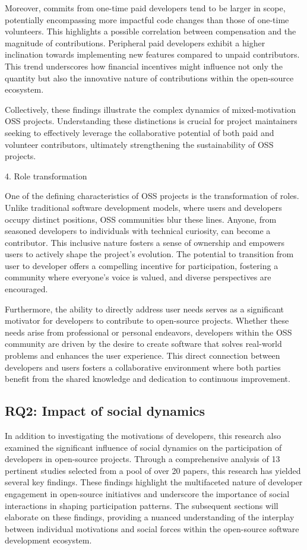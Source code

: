 Moreover, commits from one-time paid developers tend to be larger in scope, potentially encompassing more impactful code changes than those of one-time volunteers. This highlights a possible correlation between compensation and the magnitude of contributions. Peripheral paid developers exhibit a higher inclination towards implementing new features compared to unpaid contributors. This trend underscores how financial incentives might influence not only the quantity but also the innovative nature of contributions within the open-source ecosystem.

Collectively, these findings illustrate the complex dynamics of mixed-motivation OSS projects. Understanding these distinctions is crucial for project maintainers seeking to effectively leverage the collaborative potential of both paid and volunteer contributors, ultimately strengthening the sustainability of OSS projects.

4. Role transformation

One of the defining characteristics of OSS projects is the transformation of roles.  Unlike traditional software development models, where users and developers occupy distinct positions, OSS communities blur these lines.  Anyone, from seasoned developers to individuals with technical curiosity, can become a contributor.  This inclusive nature fosters a sense of ownership and empowers users to actively shape the project's evolution.  The potential to transition from user to developer offers a compelling incentive for participation, fostering a community where everyone's voice is valued, and diverse perspectives are encouraged.

Furthermore, the ability to directly address user needs serves as a significant motivator for developers to contribute to open-source projects.  Whether these needs arise from professional or personal endeavors, developers within the OSS community are driven by the desire to create software that solves real-world problems and enhances the user experience.  This direct connection between developers and users fosters a collaborative environment where both parties benefit from the shared knowledge and dedication to continuous improvement.

\subsection{RQ2: Impact of social dynamics}

In addition to investigating the motivations of developers, this research also examined the significant influence of social dynamics on the participation of developers in open-source projects. Through a comprehensive analysis of 13 pertinent studies selected from a pool of over 20 papers, this research has yielded several key findings. These findings highlight the multifaceted nature of developer engagement in open-source initiatives and underscore the importance of social interactions in shaping participation patterns. The subsequent sections will elaborate on these findings, providing a nuanced understanding of the interplay between individual motivations and social forces within the open-source software development ecosystem.

